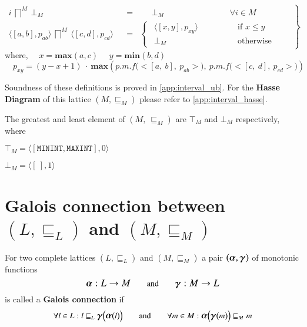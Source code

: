 \documentclass[final,3p, review, times]{util/elsarticle}
\newcommand{\ALPHA}{\large\boldsymbol{\alpha}\normalsize}
\newcommand{\GAMMA}{\large\boldsymbol{\gamma}\normalsize}
\begin{document}
\begin{equation}
\label{eq:glb_M}
 \left.\begin{aligned}
        i\ \bigsqcap^M\ \bot_M&&=&\quad\ \ \bot_M\qquad\qquad\qquad\qquad\text{$\forall i\in M$}&\\
        \langle[a,b],p_{ab}\rangle\ \bigsqcap^M\ \langle[c,d],p_{cd}\rangle&&=&\begin{cases} 
   			  \ \ \langle[x,y],p_{xy}\rangle&\qquad\qquad\text{if }x\leq y\\
   			  \ \ \bot_M&\qquad\qquad\text{otherwise}
  			\end{cases}
       \end{aligned}\quad
 \right\}
\end{equation}
where,
	$\quad x=\mathbf{max}(a,c)$
	$\quad y=\mathbf{min}(b,d)$
	$\quad\displaystyle p_{xy}=(y-x+1)\ \cdot\ \mathbf{max}\left(p.m.f\Big(\big<[a,\ b],\ p_{ab}\big>\Big),\ p.m.f\Big(\big<[c,\ d],\ p_{cd}\big>\Big)\right)$

Soundness of these definitions is proved in \ref{app:interval_ub}. For the \textbf{Hasse Diagram} of this lattice $(M,\sqsubseteq_M)$ please refer to \ref{app:interval_hasse}.

The greatest and least element of $(M,\ \sqsubseteq_M)$ are $\top_M$ and $\bot_M$ respectively, where

$\top_M=\langle[\mathtt{MININT},\mathtt{MAXINT}],0\rangle$

$\bot_M=\langle[\ ],1\rangle$

\section{Galois connection between $(L,\sqsubseteq_L)$ and $(M,\sqsubseteq_M)$}

For two complete lattices $(L,\sqsubseteq_L)$ and $(M,\sqsubseteq_M)$ a pair $(\ALPHA,\GAMMA)$ of monotonic functions
$$\ALPHA :L\to M\qquad\text{and}\qquad\GAMMA :M\to L$$
is called a \textbf{Galois connection} if
$$\forall l\in L : l\sqsubseteq_L \GAMMA\Big(\ALPHA\big(l\big)\Big)\qquad\text{and}\qquad\forall m\in M : \ALPHA\Big(\GAMMA\big(m\big)\Big)\sqsubseteq_M m$$
\end{document}
